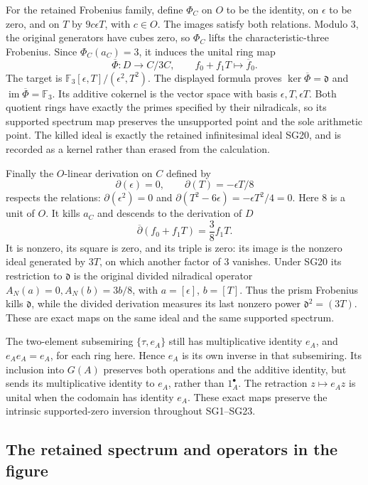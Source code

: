 \documentclass[
  10pt,
  a4paper,
]{article}
\begin{document}
For the retained Frobenius family, define \(\Phi_C\) on \(O\) to be the
identity, on \(\epsilon\) to be zero, and on \(T\) by \(9c\epsilon T\),
with \(c\in O\). The images satisfy both relations. Modulo 3, the
original generators have cubes zero, so \(\Phi_C\) lifts the
characteristic-three Frobenius. Since \(\Phi_C(a_C)=3\), it induces the
unital ring map \[
\overline\Phi:D\longrightarrow C/3C,\qquad
f_0+f_1T\longmapsto\overline f_0.
\tag{SG21}
\] The target is \(\mathbb F_3[\epsilon,T]/(\epsilon^2,T^2)\). The
displayed formula proves \(\ker\overline\Phi=\mathfrak d\) and
\(\operatorname{im}\overline\Phi=\mathbb F_3\). Its additive cokernel is
the vector space with basis \(\epsilon,T,\epsilon T\). Both quotient
rings have exactly the primes specified by their nilradicals, so its
supported spectrum map preserves the unsupported point and the sole
arithmetic point. The killed ideal is exactly the retained infinitesimal
ideal SG20, and is recorded as a kernel rather than erased from the
calculation.

Finally the \(O\)-linear derivation on \(C\) defined by \[
\partial(\epsilon)=0,\qquad \partial(T)=-\epsilon T/8
\tag{SG22}
\] respects the relations: \(\partial(\epsilon^2)=0\) and
\(\partial(T^2-6\epsilon)=-\epsilon T^2/4=0\). Here 8 is a unit of
\(O\). It kills \(a_C\) and descends to the derivation of \(D\) \[
\overline\partial(f_0+f_1T)=\frac38f_1T.
\tag{SG23}
\] It is nonzero, its square is zero, and its triple is zero: its image
is the nonzero ideal generated by \(3T\), on which another factor of 3
vanishes. Under SG20 its restriction to \(\mathfrak d\) is the original
divided nilradical operator \(A_N(a)=0,A_N(b)=3b/8\), with
\(a=[\epsilon]\), \(b=[T]\). Thus the prism Frobenius kills
\(\mathfrak d\), while the divided derivation measures its last nonzero
power \(\mathfrak d^2=(3T)\). These are exact maps on the same ideal and
the same supported spectrum.

The two-element subsemiring \(\{\tau,e_A\}\) still has multiplicative
identity \(e_A\), and \(e_Ae_A=e_A\), for each ring here. Hence \(e_A\)
is its own inverse in that subsemiring. Its inclusion into \(G(A)\)
preserves both operations and the additive identity, but sends its
multiplicative identity to \(e_A\), rather than \(1_A^\bullet\). The
retraction \(z\mapsto e_Az\) is unital when the codomain has identity
\(e_A\). These exact maps preserve the intrinsic supported-zero
inversion throughout SG1--SG23.

\subsection{The retained spectrum and operators in the
figure}\label{the-retained-spectrum-and-operators-in-the-figure}
\end{document}
